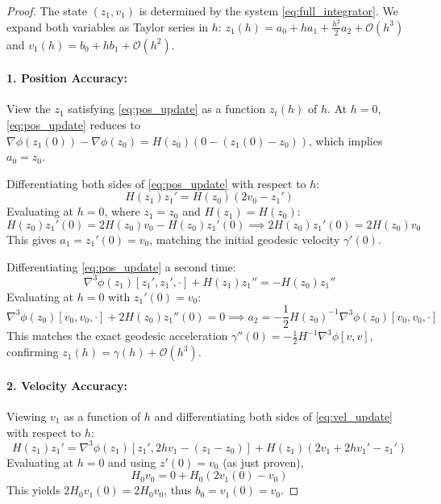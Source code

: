 \documentclass[11pt,a4paper]{article}
\begin{document}
\begin{proof}
The state $(z_1, v_1)$ is determined by the system \eqref{eq:full_integrator}. We expand both variables as Taylor series in $h$: $z_1(h) = a_0 + h a_1 + \frac{h^2}{2} a_2 + \mathcal{O}(h^3)$ and $v_1(h) = b_0 + h b_1 + \mathcal{O}(h^2)$.

\paragraph{1. Position Accuracy:}
View the $z_1$ satisfying \eqref{eq:pos_update} as a function $z_t(h)$ of $h$.
At $h=0$, \eqref{eq:pos_update} reduces to $\nabla \phi(z_1(0)) - \nabla \phi(z_0) = H(z_0)(0 - (z_1(0) - z_0))$, which implies $a_0 = z_0$.

Differentiating both sides of \eqref{eq:pos_update} with respect to $h$:
\begin{equation}
    H(z_1)z_1' = H(z_0)(2v_0 - z_1')
\end{equation}
Evaluating at $h=0$, where $z_1 = z_0$ and $H(z_1) = H(z_0)$:
\begin{equation}
    H(z_0)z_1'(0) = 2H(z_0)v_0 - H(z_0)z_1'(0) \implies 2H(z_0)z_1'(0) = 2H(z_0)v_0
\end{equation}
This gives $a_1 = z_1'(0) = v_0$, matching the initial geodesic velocity $\gamma'(0)$.

Differentiating \eqref{eq:pos_update} a second time:
\begin{equation}
    \nabla^3 \phi(z_1)[z_1', z_1', \cdot] + H(z_1)z_1'' = -H(z_0)z_1''
\end{equation}
Evaluating at $h=0$ with $z_1'(0) = v_0$:
\begin{equation}
    \nabla^3 \phi(z_0)[v_0, v_0, \cdot] + 2H(z_0)z_1''(0) = 0 \implies a_2 = -\frac{1}{2}H(z_0)^{-1}\nabla^3 \phi(z_0)[v_0, v_0, \cdot]
\end{equation}
This matches the exact geodesic acceleration $\gamma''(0) = -\frac{1}{2}H^{-1}\nabla^3\phi[v,v]$, confirming $z_1(h) = \gamma(h) + \mathcal{O}(h^3)$.

\paragraph{2. Velocity Accuracy:}
Viewing $v_1$ as a function of $h$ and differentiating both sides of \eqref{eq:vel_update} with respect to $h$:
\begin{equation}
    H(z_1)z_1' = \nabla^3 \phi(z_1)[z_1', 2hv_1 - (z_1 - z_0)] + H(z_1)(2v_1 + 2hv_1' - z_1')
\end{equation}
Evaluating at $h=0$ and using $z'(0) = v_0$ (as just proven), 
\begin{equation}
    H_0 v_0 = 0 + H_0(2v_1(0) - v_0) 
\end{equation}
This yields $2H_0 v_1(0) = 2H_0 v_0$, thus $b_0 = v_1(0) = v_0$.


\end{proof}
\end{document}
